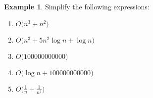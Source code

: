 \documentclass[10pt]{article}
\theoremstyle{definition}
\newtheorem{example}{Example}
\begin{document}
\newpage
\begin{example}
    Simplify the following expressions:

\begin{enumerate}
    \item $O\bigg(n^3 + n^2 \bigg)$
    \vspace{1.5in}
    \item $O\bigg(n^3 + 5n^2\log n + \log n \bigg)$
    \vspace{1.5in}
    \item $O\bigg(100000000000 \bigg)$
    \vspace{1.5in}
    \item $O\bigg(\log n + 100000000000 \bigg)$
    \vspace{1.5in}
\item $O\bigg(\frac 1 n + \frac 1 {n^2}\bigg)$
    \vspace{1.5in}
\end{enumerate}
\end{example}

\vspace{0.25in}
\noindent

\end{document}
